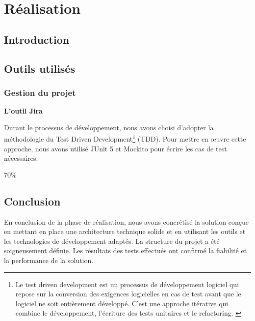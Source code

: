 \chapter{Réalisation}

\newpage

\section*{Introduction}


\section{Outils utilisés}

\subsection{Gestion du projet}

\textbf{L'outil Jira}


Durant le processus de développement, nous avons choisi d'adopter la méthodologie du Test Driven Development\footnote{
Le test driven development est un processus de développement logiciel qui repose sur la conversion des exigences logicielles en cas de test avant que le logiciel ne soit entièrement développé. C'est une approche itérative qui combine le développement, l'écriture des tests unitaires et le refactoring. \cite{tdd}
}
(TDD). Pour mettre en œuvre cette approche, nous avons utilisé JUnit 5 et Mockito pour écrire les cas de test nécessaires. \par

70\%


\section*{Conclusion}

En conclusion de la phase de réalisation, nous avons concrétisé la solution conçue en mettant en place une architecture technique solide et en utilisant les outils et les technologies de développement adaptés. La structure du projet a été soigneusement définie. Les résultats des tests effectués ont confirmé la fiabilité et la performance de la solution. 

